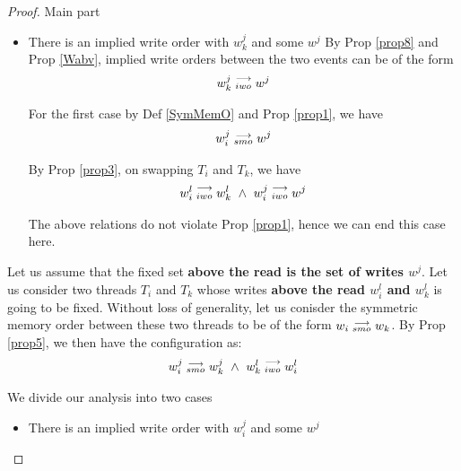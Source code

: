 \begin{proof}{Main part}
\begin{itemize}
\begin{itemize}
                        \end{itemize}
                        
                    \item There is an implied write order with $w_k^j$ and some $w^j$
                        By Prop \ref{prop8} and Prop \ref{Wabv}, implied write orders between the two events can be of the form 
                        \begin{align*}
                            w_k^j\stackrel{\longrightarrow}{_{iwo}}w^j  
                        \end{align*}

                        For the first case by Def \ref{SymMemO} and Prop \ref{prop1}, we have
                        \begin{align*}
                            w_i^j\stackrel{\longrightarrow}{_{smo}}w^j
                        \end{align*}

                        By Prop \ref{prop3}, on swapping $T_i$ and $T_k$, we have 
                        \begin{align*}
                            \reln{w_i^l}{iwo}{w_k^l} \ \wedge \ \reln{w_i^j}{iwo}{w^j}
                        \end{align*}

                        The above relations do not violate Prop \ref{prop1}, hence we can end this case here. 
                \end{itemize}


                Let us assume that the fixed set \textbf{above the read is the set of writes $w^j$}. Let us consider two threads $T_i$ and $T_k$ whose writes \textbf{above the read $w_i^l$ and $w_k^l$} is going to be fixed. Without loss of generality, let us conisder the symmetric memory order between these two threads to be of the form $w_i\stackrel{\longrightarrow}{_{smo}}w_k$.  By Prop \ref{prop5}, we then have the configuration as:
                \begin{align*}
                    \reln{w_i^j}{smo}{w_k^j} \ \wedge \ \reln{w_k^l}{iwo}{w_i^l}
                \end{align*}

                We divide our analysis into two cases 
                \begin{itemize}
                    \item There is an implied write order with $w_i^j$ and some $w^j$


\end{itemize}
\end{proof}
